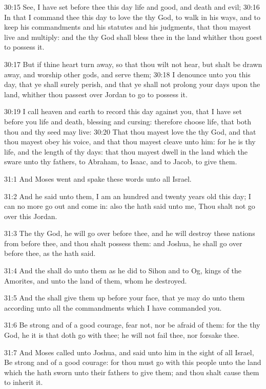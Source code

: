 30:15 See, I have set before thee this day life and good, and death
and evil; 30:16 In that I command thee this day to love the \LORD thy
God, to walk in his ways, and to keep his commandments and his
statutes and his judgments, that thou mayest live and multiply: and
the \LORD thy God shall bless thee in the land whither thou goest to
possess it.

30:17 But if thine heart turn away, so that thou wilt not hear, but
shalt be drawn away, and worship other gods, and serve them; 30:18 I
denounce unto you this day, that ye shall surely perish, and that ye
shall not prolong your days upon the land, whither thou passest over
Jordan to go to possess it.

30:19 I call heaven and earth to record this day against you, that I
have set before you life and death, blessing and cursing: therefore
choose life, that both thou and thy seed may live: 30:20 That thou
mayest love the \LORD thy God, and that thou mayest obey his voice, and
that thou mayest cleave unto him: for he is thy life, and the length
of thy days: that thou mayest dwell in the land which the \LORD sware
unto thy fathers, to Abraham, to Isaac, and to Jacob, to give them.

31:1 And Moses went and spake these words unto all Israel.

31:2 And he said unto them, I am an hundred and twenty years old this
day; I can no more go out and come in: also the \LORD hath said unto
me, Thou shalt not go over this Jordan.

31:3 The \LORD thy God, he will go over before thee, and he will
destroy these nations from before thee, and thou shalt possess them:
and Joshua, he shall go over before thee, as the \LORD hath said.

31:4 And the \LORD shall do unto them as he did to Sihon and to Og,
kings of the Amorites, and unto the land of them, whom he destroyed.

31:5 And the \LORD shall give them up before your face, that ye may do
unto them according unto all the commandments which I have commanded
you.

31:6 Be strong and of a good courage, fear not, nor be afraid of them:
for the \LORD thy God, he it is that doth go with thee; he will not
fail thee, nor forsake thee.

31:7 And Moses called unto Joshua, and said unto him in the sight of
all Israel, Be strong and of a good courage: for thou must go with
this people unto the land which the \LORD hath sworn unto their fathers
to give them; and thou shalt cause them to inherit it.

